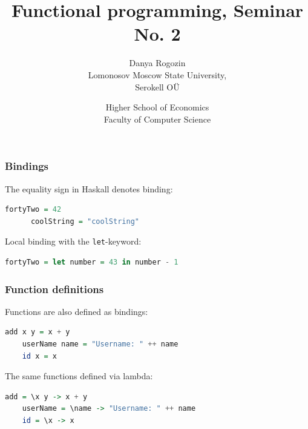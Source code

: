 \documentclass[10pt,pdf,utf8,russian,aspectratio=169]{beamer}
\title{Functional programming, Seminar No. 2}
\author{Danya Rogozin \\ Lomonosov Moscow State University, \\ Serokell O\"{U}}
\date{Higher School of Economics \\ Faculty of Computer Science}
\begin{document}
\maketitle

\begin{frame}[fragile]
  \frametitle{Bindings}

  The equality sign in Haskall denotes binding:

    \begin{lstlisting}[language=Haskell]
      fortyTwo = 42
      coolString = "coolString"
    \end{lstlisting}

\vspace{\baselineskip}

Local binding with the \verb"let"-keyword:
  \begin{lstlisting}[language=Haskell]
    fortyTwo = let number = 43 in number - 1
  \end{lstlisting}
\end{frame}

\begin{frame}[fragile]
  \frametitle{Function definitions}

  Functions are also defined as bindings:

  \begin{lstlisting}[language=Haskell]
    add x y = x + y
    userName name = "Username: " ++ name
    id x = x
  \end{lstlisting}

  \vspace{\baselineskip}

  The same functions defined via lambda:
  \begin{lstlisting}[language=Haskell]
    add = \x y -> x + y
    userName = \name -> "Username: " ++ name
    id = \x -> x
  \end{lstlisting}
\end{frame}
\end{document}
